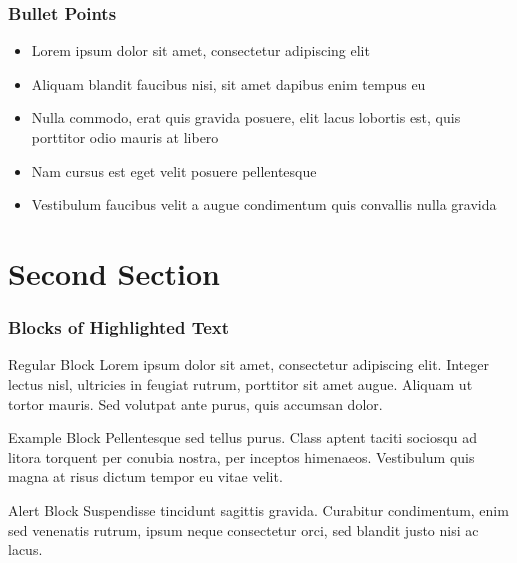\documentclass[aspectratio=169,xcolor=dvipsnames]{beamer}
\begin{document}

\begin{frame}
    \frametitle{Bullet Points}
    \begin{itemize}
        \item Lorem ipsum dolor sit amet, consectetur adipiscing elit
        \item Aliquam blandit faucibus nisi, sit amet dapibus enim tempus eu
        \item Nulla commodo, erat quis gravida posuere, elit lacus lobortis est, quis porttitor odio mauris at libero
        \item Nam cursus est eget velit posuere pellentesque
        \item Vestibulum faucibus velit a augue condimentum quis convallis nulla gravida
    \end{itemize}
\end{frame}

\section{Second Section}

\begin{frame}
    \frametitle{Blocks of Highlighted Text}
    \begin{block}{Regular Block}
        Lorem ipsum dolor sit amet, consectetur adipiscing elit. Integer lectus nisl, ultricies in feugiat rutrum, porttitor sit amet augue. Aliquam ut tortor mauris. Sed volutpat ante purus, quis accumsan dolor.
    \end{block}

    \begin{exampleblock}{Example Block}
        Pellentesque sed tellus purus. Class aptent taciti sociosqu ad litora torquent per conubia nostra, per inceptos himenaeos. Vestibulum quis magna at risus dictum tempor eu vitae velit.
    \end{exampleblock}

    \begin{alertblock}{Alert Block}
        Suspendisse tincidunt sagittis gravida. Curabitur condimentum, enim sed venenatis rutrum, ipsum neque consectetur orci, sed blandit justo nisi ac lacus.
    \end{alertblock}
\end{frame}
\end{document}
